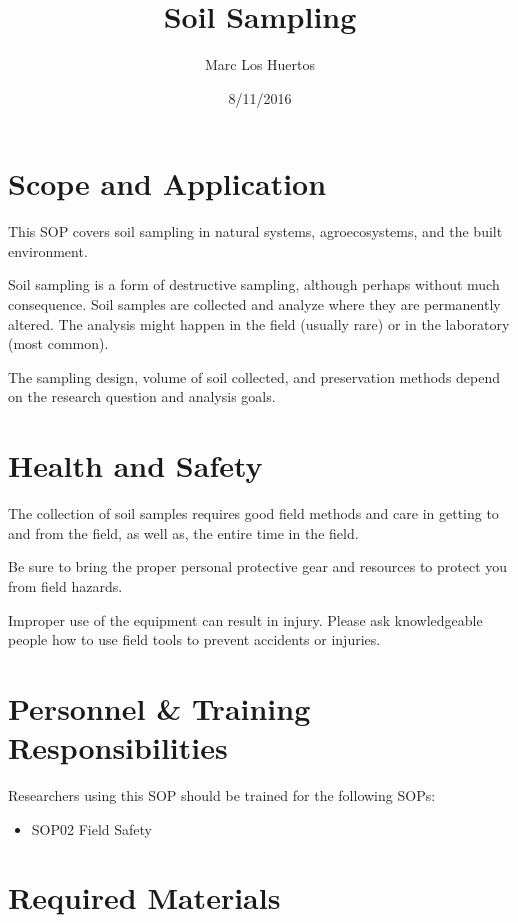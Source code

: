 \documentclass[12pt]{../SOP2}\usepackage[]{graphicx}\usepackage[]{color}
\title{Soil Sampling}
\date{8/11/2016}
\author{Marc Los Huertos}
\begin{document}
\maketitle

\section{Scope and Application}

\NP This SOP covers soil sampling in natural systems, agroecosystems, and the built environment. 

\NP Soil sampling is a form of destructive sampling, although perhaps without much consequence. Soil samples are collected and analyze where they are permanently altered. The analysis might happen in the field (usually rare) or in the laboratory (most common). 

\NP The sampling design, volume of soil collected, and preservation methods depend on the research question and analysis goals.  

\section{Health and Safety}

\NP The collection of soil samples requires good field methods and care in getting to and from the field, as well as, the entire time in the field. 

\NP Be sure to bring the proper personal protective gear and resources to protect you from field hazards.

\NP Improper use of the equipment can result in injury. Please ask knowledgeable people how to use field tools to prevent accidents or injuries.


\section{Personnel \& Training Responsibilities}

\NP Researchers using this SOP should be trained for the following SOPs:

\begin{itemize}
  \item SOP02 Field Safety
\end{itemize}


\section{Required Materials}
\end{document}
